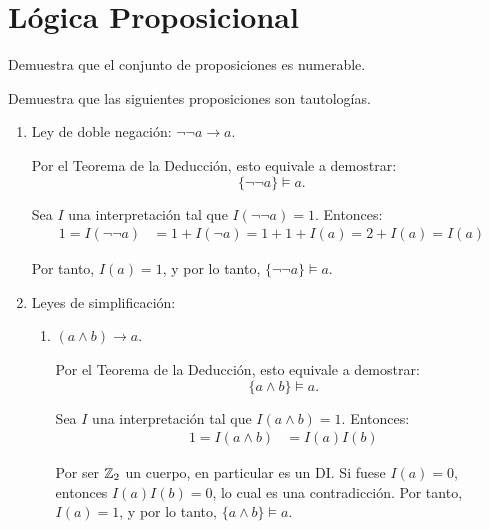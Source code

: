 \section{Lógica Proposicional}

\begin{ejercicio}\label{ej:1.1}
    Demuestra que el conjunto de proposiciones es numerable.
\end{ejercicio}

\begin{ejercicio}\label{ej:1.2}
    Demuestra que las siguientes proposiciones son tautologías.
    \begin{enumerate}
        \item Ley de doble negación: $\neg\neg a \rightarrow a$.
        
        Por el Teorema de la Deducción, esto equivale a demostrar:
        \begin{equation*}
            \{\neg\neg a\} \models a.
        \end{equation*}

        Sea $I$ una interpretación tal que $I(\neg\neg a) = 1$. Entonces:
        \begin{align*}
            1=I(\neg\neg a) &= 1 + I(\neg a) = 1+1+I(a) = 2+I(a) = I(a)
        \end{align*}

        Por tanto, $I(a) = 1$, y por lo tanto, $\{\neg\neg a\} \models a$.
        \item Leyes de simplificación:
        \begin{enumerate}
            \item $(a\land b) \rightarrow a$.
            
            Por el Teorema de la Deducción, esto equivale a demostrar:
            \begin{equation*}
                \{a\land b\} \models a.
            \end{equation*}

            Sea $I$ una interpretación tal que $I(a\land b) = 1$. Entonces:
            \begin{align*}
                1=I(a\land b) &= I(a)I(b)
            \end{align*}
            
            Por ser $\mathbb{Z}_2$ un cuerpo, en particular es un DI. Si fuese $I(a) = 0$, entonces $I(a)I(b) = 0$, lo cual es una contradicción. Por tanto, $I(a) = 1$, y por lo tanto, $\{a\land b\} \models a$.



\end{enumerate}
\end{enumerate}
\end{ejercicio}
